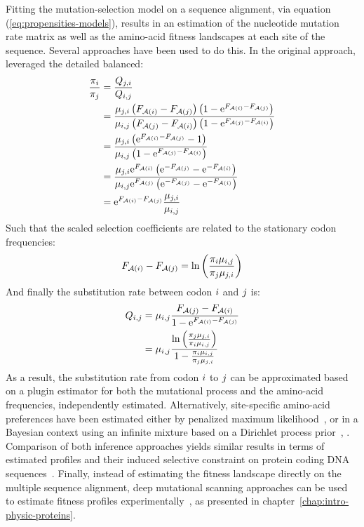 Fitting the mutation-selection model on a sequence alignment, via equation (\ref{eq:propensities-models}), results in an estimation of the nucleotide mutation rate matrix as well as the amino-acid fitness landscapes at each site of the sequence.
Several approaches have been used to do this.
In the original approach, \citet{Halpern1998} leveraged the detailed balanced:
\begin{align}
    \frac{\pi_{{i}}}{\pi_{{j}}} & = \frac{Q_{{j}, {i}}}{Q_{{i}, {j}}} \\
    & = \frac{\mu_{{j}, {i}} \left( F_{\mathcal{A}({i})} - F_{\mathcal{A}({j})} \right) \left(1 - \mathrm{e}^{F_{\mathcal{A}({i})} - F_{\mathcal{A}({j})}} \right)}{\mu_{{i}, {j}}\left( F_{\mathcal{A}({j})} - F_{\mathcal{A}({i})} \right) \left(1 - \mathrm{e}^{F_{\mathcal{A}({j})} - F_{\mathcal{A}({i})}} \right)} \\
    & =  \frac{\mu_{{j}, {i}} \left(\mathrm{e}^{F_{\mathcal{A}({i})} - F_{\mathcal{A}({j})}} - 1 \right)}{\mu_{{i}, {j}} \left(1 - \mathrm{e}^{F_{\mathcal{A}({j})} - F_{\mathcal{A}({i})}} \right)} \\
    & =  \frac{\mu_{{j}, {i}} \mathrm{e}^{F_{\mathcal{A}({i})}} \left(\mathrm{e}^{- F_{\mathcal{A}({j})}} - \mathrm{e}^{- F_{\mathcal{A}({i})}} \right)}{\mu_{{i}, {j}}  \mathrm{e}^{F_{\mathcal{A}({j})}} \left(\mathrm{e}^{- F_{\mathcal{A}({j})}} - \mathrm{e}^{- F_{\mathcal{A}({i})}} \right)} \\
    & =  \mathrm{e}^{F_{\mathcal{A}({i})} - F_{\mathcal{A}({j})}} \frac{\mu_{{j}, {i}} }{\mu_{{i}, {j}}}
\end{align}
Such that the scaled selection coefficients are related to the stationary codon frequencies:
\begin{equation}
    F_{\mathcal{A}({i})} - F_{\mathcal{A}({j})} = \ln \left( \frac{\pi_{{i}} \mu_{{i}, {j}} }{\pi_{{j}} \mu_{{j}, {i}}} \right)
\end{equation}
And finally the substitution rate between codon ${i}$ and ${j}$ is:
\begin{align}
    Q_{{i}, {j}} & = \mu_{{i}, {j}} \dfrac{F_{\mathcal{A}({j})} - F_{\mathcal{A}({i})}}{1 - \mathrm{e}^{F_{\mathcal{A}({i})} - F_{\mathcal{A}({j})}} } \\
    & = \mu_{{i}, {j}} \frac{ \ln \left( \frac{\pi_{{j}} \mu_{{j}, {i}}}{\pi_{{i}} \mu_{{i}, {j}} } \right) }{ 1 -  \frac{\pi_{{i}} \mu_{{i}, {j}} }{\pi_{{j}} \mu_{{j}, {i}}} }
\end{align}
As a result, the substitution rate from codon ${i}$ to ${j}$ can be approximated based on a plugin estimator for both the mutational process and the amino-acid frequencies, independently estimated.
Alternatively, site-specific amino-acid preferences have been estimated either by penalized maximum likelihood~\citep{Tamuri2012,Tamuri2014}, or in a Bayesian context using an infinite mixture based on a Dirichlet process prior~\citep{Rodrigue2010, Rodrigue2014}, .
Comparison of both inference approaches yields similar results in terms of estimated profiles and their induced selective constraint on protein coding DNA sequences~\citep{Spielman2016a}.
Finally, instead of estimating the fitness landscape directly on the multiple sequence alignment, deep mutational scanning approaches can be used to estimate fitness profiles experimentally~\citep{Bloom2014,Bloom2014a}, as presented in chapter~\ref{chap:intro-physic-proteins}.

